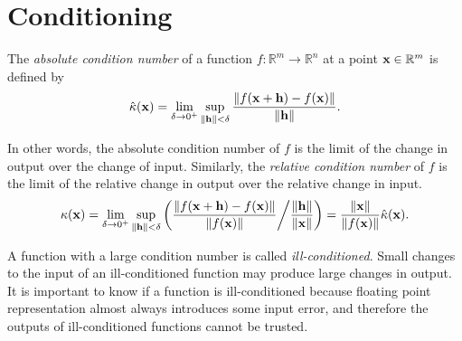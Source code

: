 
\section*{Conditioning} %

The \emph{absolute condition number} of a function $f: \mathbb{R}^m \rightarrow \mathbb{R}^n$ at a point $\mathbf{x}\in\mathbb{R}^m$ is defined by
\begin{equation}
\hat{\kappa} (\mathbf{x}) = \lim_{\delta \rightarrow 0^+} \sup_{\left\lVert\mathbf{h}\right\rVert < \delta} { \frac{\left\lVert f(\mathbf{x} + \mathbf{h} ) - f(\mathbf{x})\right\rVert}{\left\lVert\mathbf{h}\right\rVert} }.
\label{eq:absolute-condition-number}
\end{equation}

In other words, the absolute condition number of $f$ is the limit of the change in output over the change of input.
Similarly, the \emph{relative condition number} of $f$ is the limit of the relative change in output over the relative change in input.
\begin{equation}
\kappa(\mathbf{x})
= \lim_{\delta \rightarrow 0^+} \sup_{\left\lVert\mathbf{h}\right\rVert < \delta} \left({ \frac{\left\lVert f(\mathbf{x} + \mathbf{h} ) - f(\mathbf{x})\right\rVert}{\left\lVert f(\mathbf{x})\right\rVert} } \middle/ { \frac{\left\lVert\mathbf{h}\right\rVert}{\left\lVert\mathbf{x}\right\rVert} }\right)
= \frac{\left\lVert\mathbf{x}\right\rVert}{\left\lVert f(\mathbf{x})\right\rVert} \hat{\kappa}(\mathbf{x}).
\label{eq:relative-condition-number}
\end{equation}

A function with a large condition number is called \emph{ill-conditioned}.
Small changes to the input of an ill-conditioned function may produce large changes in output.
It is important to know if a function is ill-conditioned because floating point representation almost always introduces some input error, and therefore the outputs of ill-conditioned functions cannot be trusted.


